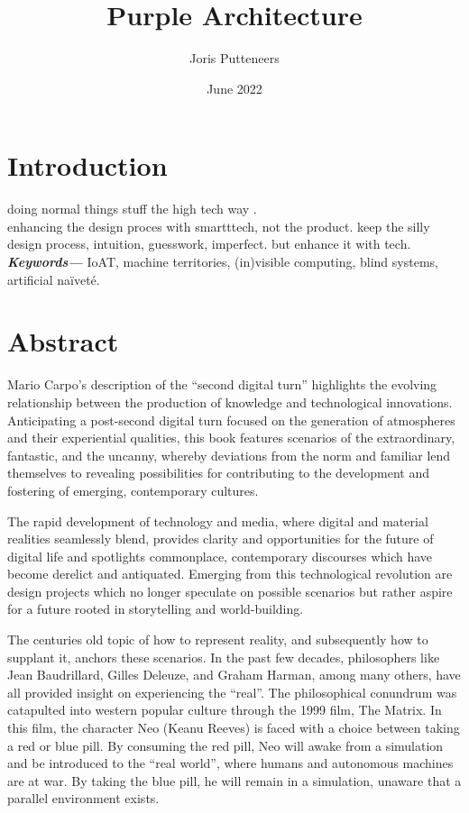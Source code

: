 \documentclass{article}
\title{\textbf{Purple Architecture}}
\author{Joris Putteneers}
\date{June 2022}
\providecommand{\keywords}[1]
{
  \small	
  \textbf{\textit{Keywords---}} #1
}
\begin{document}
\maketitle
\tableofcontents

\section{Introduction}
doing normal things stuff the high tech way \cite{databaseII}.\\

enhancing the design proces with smartttech, not the product.
keep the silly design process, intuition, guesswork, imperfect. but enhance it with tech. \\


\keywords{IoAT, machine territories, (in)visible computing, blind systems, artificial naïveté.}

\section{Abstract}
Mario Carpo's description of the “second digital turn” highlights the evolving relationship between the production of knowledge and technological innovations. Anticipating a post-second digital turn focused on the generation of atmospheres and their experiential qualities, this book features scenarios of the extraordinary, fantastic, and the uncanny, whereby deviations from the norm and familiar lend themselves to revealing possibilities for contributing to the development and fostering of emerging, contemporary cultures.



The rapid development of technology and media, where digital and material realities seamlessly blend, provides clarity and opportunities for the future of digital life and spotlights commonplace, contemporary discourses which have become derelict and antiquated. Emerging from this technological revolution are design projects which no longer speculate on possible scenarios but rather aspire for a future rooted in storytelling and world-building. 


The centuries old topic of how to represent reality, and subsequently how to supplant it, anchors these scenarios. In the past few decades, philosophers like Jean Baudrillard, Gilles Deleuze, and Graham Harman, among many others, have all provided insight on experiencing the “real”. The philosophical conundrum was catapulted into western popular culture through the 1999 film, The Matrix. In this film, the character Neo (Keanu Reeves) is faced with a choice between taking a red or blue pill. By consuming the red pill, Neo will awake from a simulation and be introduced to the “real world”, where humans and autonomous machines are at war. By taking the blue pill, he will remain in a simulation, unaware that a parallel environment exists. 
\end{document}

